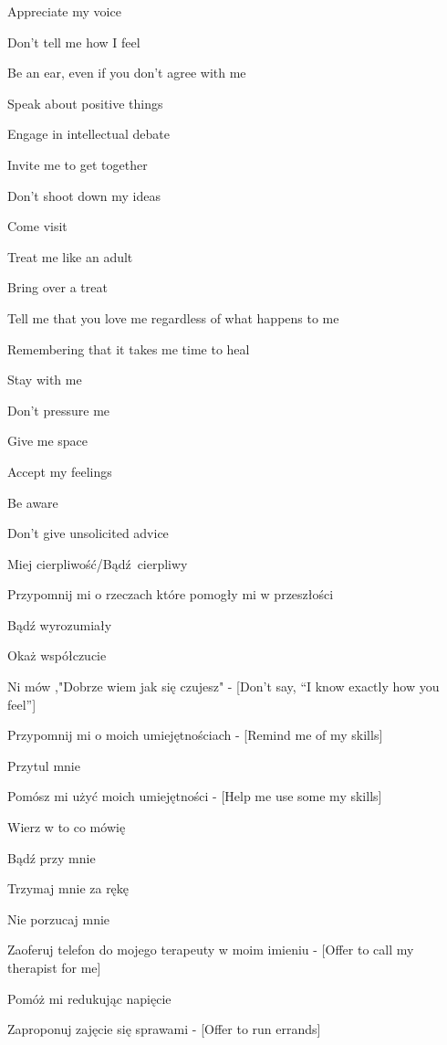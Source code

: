 \begin{multicols}{2}
\begin{checkboxlist}
\item Appreciate my voice
\item Don’t tell me how I feel
\item Be an ear, even if you don’t agree with me
\item Speak about positive things
\item Engage in intellectual debate
\item Invite me to get together
\item Don’t shoot down my ideas
\item Come visit
\item Treat me like an adult
\item Bring over a treat
\item Tell me that you love me regardless of what happens to me
\item Remembering that it takes me time to heal
\item Stay with me
\item Don’t pressure me
\item Give me space
\item Accept my feelings
\item Be aware
\item Don’t give unsolicited advice
\item Miej cierpliwość/Bądź cierpliwy
\item Przypomnij mi o rzeczach które pomogły mi w przeszłości
\item Bądź wyrozumiały
\item Okaż współczucie
\item Ni mów ,"Dobrze wiem jak się czujesz" - [Don’t say, “I know exactly how you feel”]
\item Przypomnij mi o moich umiejętnościach - [Remind me of my skills]
\item Przytul mnie
\item Pomósz mi użyć moich umiejętności - [Help me use some my skills]
\item Wierz w to co mówię
\item Bądź przy mnie
\item Trzymaj mnie za rękę
\item Nie porzucaj mnie
\item Zaoferuj telefon do mojego terapeuty w moim imieniu - [Offer to call my therapist for me]
\item Pomóż mi redukując napięcie
\item Zaproponuj zajęcie się sprawami - [Offer to run errands]
\end{checkboxlist}
\end{multicols}

